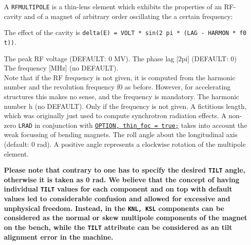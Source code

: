 
A {\tt RFMULTIPOLE} is a thin-lens element which exhibits the properties
of an RF-cavity and of a magnet of arbitrary order oscillating the
a certain frequency:        

The effect of the cavity is {\tt delta(E) = VOLT * sin(2 pi * (LAG - HARMON *
f0 t))}. 
 
\begin{madlist}
    The peak RF voltage (DEFAULT: 0 MV).  
    The phase lag [2pi] (DEFAULT: 0) 
    The frequency [MHz] (no DEFAULT). \\ 
     Note that if the RF
     frequency is not given, it is computed from the harmonic
     number and the revolution frequency f0 as before. However, for
     accelerating structures this makes no sense, and the frequency
     is mandatory.  
    The harmonic number h (no DEFAULT). Only if the
     frequency is not given. 
    A fictitious length, which was originally just used to
     compute synchrotron radiation effects. A non-zero {\tt LRAD} in
     conjunction with \hyperref[sec:option]{\tt OPTION, thin\_foc = true;} 
     takes into account the weak focussing of bending magnets.  
    The roll angle about the longitudinal axis (default: 0
     rad). A positive angle represents a clockwise rotation of the
     multipole element.            

     \textbf{Please note that contrary to \madeight one has to specify the
       desired {\tt TILT} angle, otherwise it is taken as 0 rad. We
       believe that the \madeight concept of having individual {\tt TILT}
       values for each component and on top with default values
       led to considerable confusion and allowed for excessive
       and unphysical freedom. Instead, in \madx the {\tt KNL, KSL}
       components can be considered as the normal or skew
       multipole components of the magnet on the bench, while the
       {\tt TILT} attribute can be considered as an tilt alignment
       error in the machine.} 


\end{madlist}
